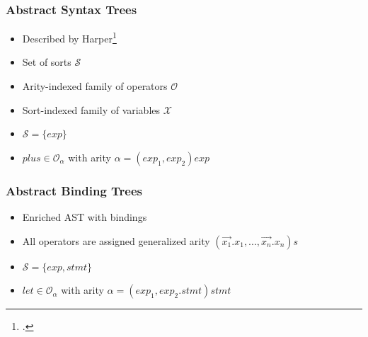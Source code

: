\documentclass[t,24pt,aspectratio=169]{beamer}
\begin{document}
\begin{frame}
    \frametitle{Abstract Syntax Trees}
    \begin{multicols}{2}
        \begin{itemize}
            \item Described by Harper\footcite{harper}
            \item Set of sorts $\mathcal{S}$
            \item Arity-indexed family of operators $\mathcal{O}$
            \item Sort-indexed family of variables $\mathcal{X}$
        \end{itemize}

        \columnbreak
        \pause
        \begin{itemize}
            \item $\mathcal{S} = \{ exp \}$
            \item $plus \in \mathcal{O}_\alpha$ with arity $\alpha = (exp_1,exp_2)exp$
        \end{itemize}

    \end{multicols}

\end{frame}

\begin{frame}
    \frametitle{Abstract Binding Trees}
    \begin{multicols}{2}
        \begin{itemize}
            \item Enriched AST with bindings
            \item All operators are assigned generalized arity $(\vec{x_1}.x_1,...,\vec{x_n}.x_n)s$
        \end{itemize}
        \columnbreak
        \pause
        \begin{itemize}
            \item $\mathcal{S} = \{ exp, stmt \}$
            \item $let \in \mathcal{O}_\alpha$ with arity $\alpha = (exp_1,exp_2.stmt)stmt$
        \end{itemize}
    \end{multicols}

\end{frame}
\end{document}
